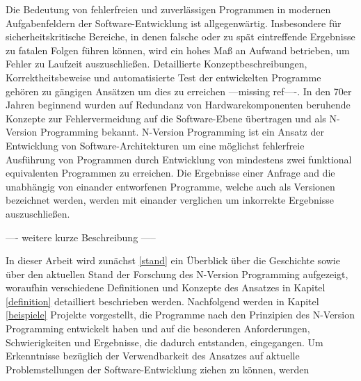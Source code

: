 Die Bedeutung von fehlerfreien und zuverlässigen Programmen in modernen Aufgabenfeldern der Software-Entwicklung ist allgegenwärtig.
Insbesondere für sicherheitskritische Bereiche, in denen falsche oder zu spät eintreffende Ergebnisse zu fatalen Folgen führen können, wird ein hohes Maß an Aufwand betrieben, um Fehler zu Laufzeit auszuschließen.
Detaillierte Konzeptbeschreibungen, Korrektheitsbeweise und automatisierte Test der entwickelten Programme gehören zu gängigen Ansätzen um dies zu erreichen ---missing ref----.
In den 70er Jahren beginnend wurden auf Redundanz von Hardwarekomponenten beruhende Konzepte zur Fehlervermeidung auf die Software-Ebene übertragen und als N-Version Programming bekannt.
N-Version Programming ist ein Ansatz der Entwicklung von Software-Architekturen um eine möglichst fehlerfreie Ausführung von Programmen durch Entwicklung von mindestens zwei funktional equivalenten Programmen zu erreichen.
Die Ergebnisse einer Anfrage and die unabhängig von einander entworfenen Programme, welche auch als Versionen bezeichnet werden, werden mit einander verglichen um inkorrekte Ergebnisse auszuschließen.

---- weitere kurze Beschreibung -----


In dieser Arbeit wird zunächst \ref{stand} ein Überblick über die Geschichte sowie über den aktuellen Stand der Forschung des N-Version Programming aufgezeigt, woraufhin verschiedene Definitionen und Konzepte des Ansatzes in Kapitel \ref{definition} detailliert beschrieben werden. Nachfolgend werden in Kapitel \ref{beispiele} Projekte vorgestellt, die Programme nach den Prinzipien des N-Version Programming entwickelt haben und auf die besonderen Anforderungen, Schwierigkeiten und Ergebnisse, die dadurch entstanden, eingegangen.
Um Erkenntnisse bezüglich der Verwendbarkeit des Ansatzes auf aktuelle Problemstellungen der Software-Entwicklung ziehen zu können, werden 